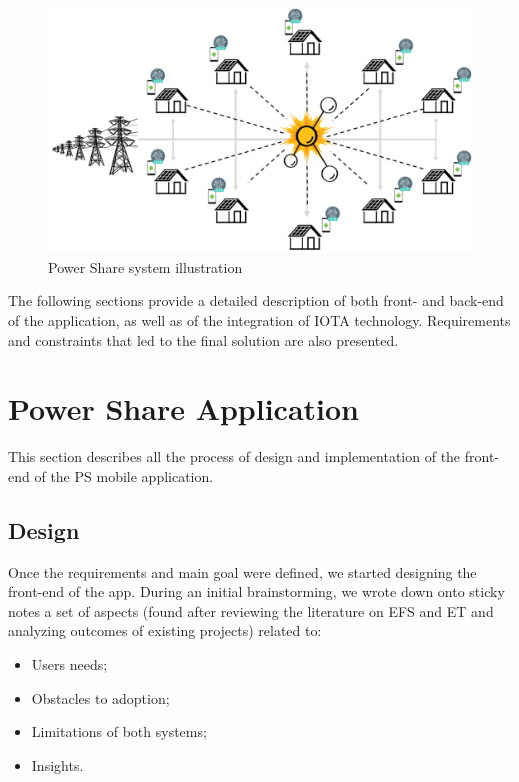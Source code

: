 \begin{figure}[h]
\centering
\includegraphics[width=1.0\textwidth]{./Images/ps}
\caption{Power Share system illustration}
\label{fig:ps}
\end{figure}


The following sections provide a detailed description of both front- and back-end of the application, as well as of the integration of IOTA technology. Requirements and constraints that led to the final solution are also presented. 

\section{Power Share Application}


This section describes all the process of design and implementation of the front-end of the \ac{PS} mobile application.



\subsection{Design}


Once the requirements and main goal  were defined, we started designing the front-end of the app.  During an initial brainstorming, we wrote down onto sticky notes a set of aspects (found after reviewing the literature on \ac{EFS} and \ac{ET} and analyzing outcomes of existing projects) related to:

\begin{itemize}
    \item Users needs;
    \item Obstacles to adoption;
    \item Limitations of both systems;
    \item Insights.
\end{itemize}


